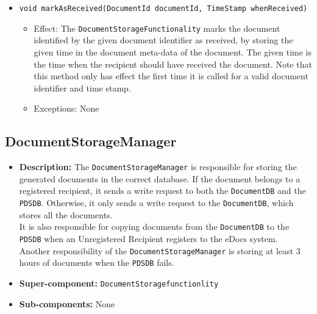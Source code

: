 \documentclass[a4paper,10pt]{article}
\begin{document}
\begin{itemize}
\begin{itemize}
        \item \texttt{void markAsReceived(DocumentId documentId, TimeStamp whenReceived)}
        \begin{itemize}
            \item Effect: The \texttt{DocumentStorageFunctionality} marks the document identified by the given document identifier as received, by storing the given time in the document meta-data of the document. The given time is the time when the recipient should have received the document. Note that this method only has effect the first time it is called for a valid document identifier and time stamp.
            \item Exceptions: None
        \end{itemize}


    \end{itemize}

\end{itemize}


\subsection{DocumentStorageManager}
\begin{itemize}
    \item \textbf{Description:} The \texttt{DocumentStorageManager} is responsible for storing the generated documents in the correct database. If the document belongs to a registered recipient, it sends a write request to both the \texttt{DocumentDB} and the \texttt{PDSDB}. Otherwise, it only sends a write request to the \texttt{DocumentDB}, which stores all the documents.\\
    It is also responsible for copying documents from the \texttt{DocumentDB} to the \texttt{PDSDB} when an Unregistered Recipient registers to the eDocs system.\\ Another responsibility of the \texttt{DocumentStorageManager} is storing at least 3 hours of documents when the \texttt{PDSDB} fails.
    \item \textbf{Super-component:} \texttt{DocumentStoragefunctionlity}
    \item \textbf{Sub-components:} None
\end{itemize}
\end{document}
